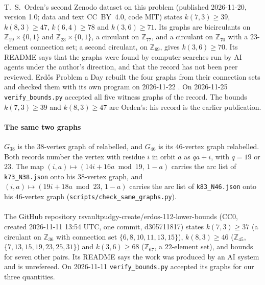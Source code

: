\documentclass[11pt]{amsart}
\newcommand{\Z}{\mathbb{Z}}
\theoremstyle{plain}
\theoremstyle{definition}
\theoremstyle{remark}
\begin{document}
\paragraph{\cite{Orden2}} T.~S.~Orden's second Zenodo dataset on this problem (published
2026-11-20, version 1.0; data and text CC~BY~4.0, code MIT) states $k(7,3)\geq 39$,
$k(8,3)\geq 47$, $k(6,4)\geq 78$ and $k(3,6)\geq 71$. Its graphs are bicirculants on
$\Z_{19}\times\{0,1\}$ and $\Z_{23}\times\{0,1\}$, a circulant on $\Z_{77}$, and a circulant on
$\Z_{70}$ with a $23$-element connection set; a second circulant, on $\Z_{69}$, gives
$k(3,6)\geq 70$. Its README says that the graphs were found by computer searches run by AI agents
under the author's direction, and that the record has not been peer reviewed. Erd\H{o}s Problem a
Day rebuilt the four graphs from their connection sets and checked them with its own program on
2026-11-22 \cite{EPAD}. On 2026-11-25 \texttt{verify\_bounds.py} accepted all five witness graphs of
the record. The bounds $k(7,3)\geq 39$ and $k(8,3)\geq 47$ are Orden's: his record is the earlier
publication.

\paragraph{The same two graphs} $G_{38}$ is the $38$-vertex graph of \cite{Orden2} relabelled, and
$G_{46}$ is its $46$-vertex graph relabelled. Both records number the vertex with residue $i$ in
orbit $a$ as $qa+i$, with $q=19$ or $23$. The map $(i,a)\mapsto(14i+16a \bmod 19,\,1-a)$ carries
the arc list of \texttt{k73\_N38.json} onto his $38$-vertex graph, and
$(i,a)\mapsto(19i+18a \bmod 23,\,1-a)$ carries the arc list of \texttt{k83\_N46.json} onto his
$46$-vertex graph (\texttt{scripts/check\_same\_graphs.py}).

\paragraph{\cite{rsv}} The GitHub repository rsvaultpudgy-create/erdos-112-lower-bounds (CC0,
created 2026-11-11 13:54 UTC, one commit, d305711817) states $k(7,3)\geq 37$ (a circulant on
$\Z_{36}$ with connection set $\{6,8,10,11,13,15\}$), $k(8,3)\geq 46$ ($\Z_{45}$,
$\{7,13,15,19,23,25,31\}$) and $k(3,6)\geq 68$ ($\Z_{67}$, a $22$-element set), and bounds for seven
other pairs. Its README says the work was produced by an AI system and is unrefereed. On 2026-11-11
\texttt{verify\_bounds.py} accepted its graphs for our three quantities.
\end{document}

